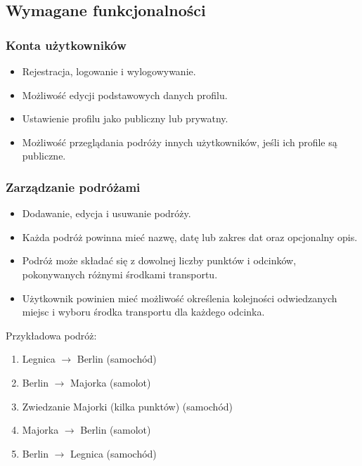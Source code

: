 \documentclass[a4paper,12pt]{article}
\begin{document}
\subsection{Wymagane funkcjonalności}

\subsubsection*{Konta użytkowników}

\begin{itemize}
  \item Rejestracja, logowanie i wylogowywanie.
  \item Możliwość edycji podstawowych danych profilu.
  \item Ustawienie profilu jako publiczny lub prywatny.
  \item Możliwość przeglądania podróży innych użytkowników, jeśli ich profile są publiczne.
\end{itemize}

\subsubsection*{Zarządzanie podróżami}

\begin{itemize}
  \item Dodawanie, edycja i usuwanie podróży.
  \item Każda podróż powinna mieć nazwę, datę lub zakres dat oraz opcjonalny opis.
  \item Podróż może składać się z dowolnej liczby punktów i odcinków, pokonywanych różnymi
        środkami transportu.
  \item Użytkownik powinien mieć możliwość określenia kolejności odwiedzanych miejsc i wyboru
        środka transportu dla każdego odcinka.
\end{itemize}

Przykładowa podróż:

\begin{enumerate}
  \item Legnica $\rightarrow$ Berlin (samochód)
  \item Berlin $\rightarrow$ Majorka (samolot)
  \item Zwiedzanie Majorki (kilka punktów) (samochód)
  \item Majorka $\rightarrow$ Berlin (samolot)
  \item Berlin $\rightarrow$ Legnica (samochód)
\end{enumerate}
\end{document}
